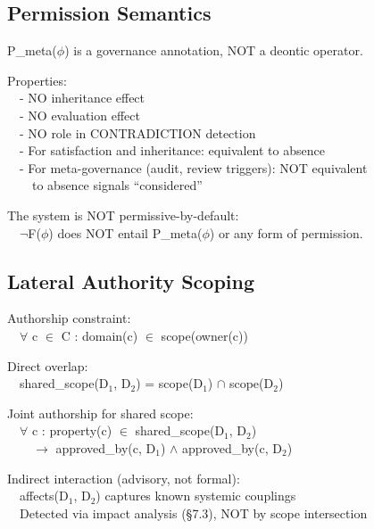 \subsection{Permission Semantics}
\label{sec:formal-model-A-1-6}


\begin{claddisp}
P\_meta($\phi$) is a governance annotation, NOT a deontic operator.
\par\smallskip
Properties:\\
~~- NO inheritance effect\\
~~- NO evaluation effect\\
~~- NO role in CONTRADICTION detection\\
~~- For satisfaction and inheritance: equivalent to absence\\
~~- For meta-governance (audit, review triggers): NOT equivalent\\
~~~~to absence \textemdash{} signals ``considered''
\par\smallskip
The system is NOT permissive-by-default:\\
~~$\neg$F($\phi$) does NOT entail P\_meta($\phi$) or any form of permission.
\end{claddisp}


\subsection{Lateral Authority Scoping}
\label{sec:formal-model-A-1-7}


\begin{claddisp}
Authorship constraint:\\
~~$\forall$ c $\in$ C : domain(c) $\in$ scope(owner(c))
\par\smallskip
Direct overlap:\\
~~shared\_scope(D$_1$, D$_2$) = scope(D$_1$) $\cap$ scope(D$_2$)
\par\smallskip
Joint authorship for shared scope:\\
~~$\forall$ c : property(c) $\in$ shared\_scope(D$_1$, D$_2$)\\
~~~~$\to$ approved\_by(c, D$_1$) $\wedge$ approved\_by(c, D$_2$)
\par\smallskip
Indirect interaction (advisory, not formal):\\
~~affects(D$_1$, D$_2$) \textemdash{} captures known systemic couplings\\
~~Detected via impact analysis (\S{}7.3), NOT by scope intersection
\end{claddisp}


